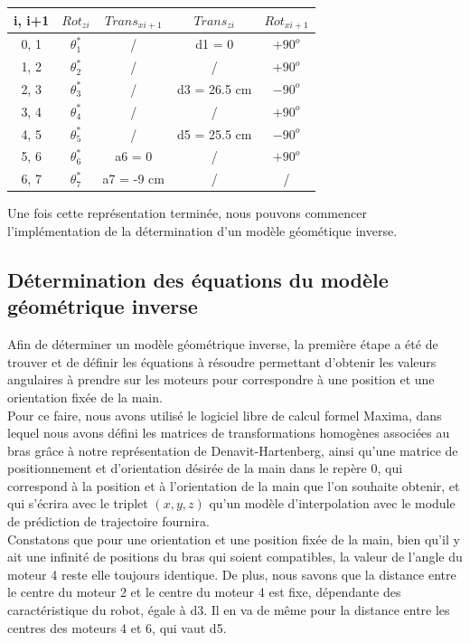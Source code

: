 \begin{tabular}{|c|c|c|c|c|}
\hline
i, i+1 & $Rot_{zi}$ & $Trans_{xi+1}$ & $Trans_{zi}$ & $Rot_{xi+1}$\\
\hline   
0, 1 & $\theta_1^*$ & / & d1 = 0 & $+90^o$        \\
1, 2 & $\theta_2^*$ & / & / & $+90^o$\\
2, 3 & $\theta_3^*$ & / & d3 = 26.5 cm & $-90^o$\\
3, 4 & $\theta_4^*$ & / & / & $+90^o$\\
4, 5 & $\theta_5^*$ & / & d5 = 25.5 cm& $-90^o$\\
5, 6 & $\theta_6^*$ & a6 = 0 & / & $+90^o$\\
6, 7 & $\theta_7^*$ & a7 = -9 cm & / & / \\
\hline
\end{tabular}

Une fois cette représentation terminée, nous pouvons commencer l'implémentation de la détermination d'un modèle géométique inverse.

\subsection{Détermination des équations du modèle géométrique inverse}

Afin de déterminer un modèle géométrique inverse, la première étape a été de trouver et de définir les équations à résoudre permettant d'obtenir les valeurs angulaires à prendre sur les moteurs pour correspondre à une position et une orientation fixée de la main.\\

Pour ce faire, nous avons utilisé le logiciel libre de calcul formel Maxima, dans lequel nous avons défini les matrices de transformations homogènes associées au bras grâce à notre représentation de Denavit-Hartenberg, ainsi qu'une matrice de positionnement et d'orientation désirée de la main dans le repère 0, qui correspond à la position et à l'orientation de la main que l'on souhaite obtenir, et qui s'écrira avec le triplet $(x, y, z)$ qu'un modèle d'interpolation avec le module de prédiction de trajectoire fournira.\\

Constatons que pour une orientation et une position fixée de la main, bien qu'il y ait une infinité de positions du bras qui soient compatibles, la valeur de l'angle du moteur 4 reste elle toujours identique. De plus, nous savons que la distance entre le centre du moteur 2 et le centre du moteur 4 est fixe, dépendante des caractéristique du robot, égale à d3. Il en va de même pour la distance entre les centres des moteurs 4 et 6, qui vaut d5.\\

